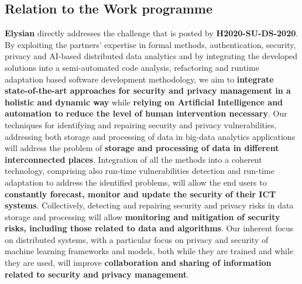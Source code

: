 \documentclass[a4paper,11pt]{article}
\newcommand{\project}[1]{\textbf{#1}\xspace}
\newcommand{\SECURITY}{\project{Elysian}}
\newcommand{\TheProject}{\SECURITY}
\begin{document}
\subsection{Relation to the Work programme}
\TheProject{} directly addresses the challenge that is posted by \textbf{H2020-SU-DS-2020}. By exploiting the partners' expertise in formal methods, authentication, security, privacy and AI-based distributed data analytics and by integrating the developed solutions into a semi-automated code analysis, refactoring and runtime adaptation based software development methodology, we aim to \textbf{integrate state-of-the-art approaches for security and privacy management in a holistic and dynamic way} while \textbf{relying on Artificial Intelligence and automation to reduce the level of human intervention necessary}. Our techniques for identifying and repairing security and privacy vulnerabilities, addressing both storage and processing of data in big-data analytics applications will address the problem of \textbf{storage and processing of data in different interconnected places}. Integration of all the methods into a coherent technology, comprising also run-time vulnerabilities detection and run-time adaptation to address the identified problems, will allow the end users to  \textbf{constantly forecast, monitor and update the security of their ICT systems}. Collectively, detecting and repairing security and privacy risks in data storage and processing will allow \textbf{monitoring and mitigation of security risks, including those related to data and algorithms}. Our inherent focus on distributed systems, with a particular focus on privacy and security of machine learning frameworks and models, both while they are trained and while they are used, will improve \textbf{collaboration and sharing of information related to security and privacy management}. 
\end{document}
